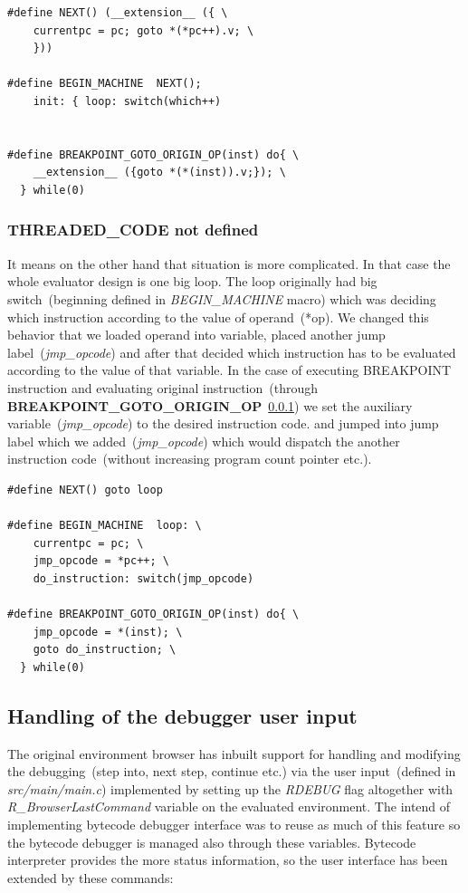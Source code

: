 \documentclass[thesis=M,english]{FITthesis}[2018/10/20]
\begin{document}
\begin{lstlisting}
#define NEXT() (__extension__ ({ \
    currentpc = pc; goto *(*pc++).v; \
    }))

#define BEGIN_MACHINE  NEXT(); 
    init: { loop: switch(which++)


#define BREAKPOINT_GOTO_ORIGIN_OP(inst) do{ \
    __extension__ ({goto *(*(inst)).v;}); \
  } while(0)
\end{lstlisting}


\subsubsection{THREADED{\_}CODE not defined}
It means on the other hand that situation is more complicated. In that case the whole evaluator design is one big loop. The loop originally had big switch~(beginning defined in \textit{BEGIN{\_}MACHINE} macro) which was deciding which instruction according to the value of operand~(*op). We changed this behavior that we loaded operand into variable, placed another jump label~(\textit{jmp{\_}opcode}) and after that decided which instruction has to be evaluated according to the value of that variable. In the case of executing BREAKPOINT instruction and evaluating original instruction~(through \textbf{BREAKPOINT{\_}GOTO{\_}ORIGIN{\_}OP}~\ref{}) we set the auxiliary variable~(\textit{jmp{\_}opcode}) to the desired instruction code.  and jumped into jump label which we added~(\textit{jmp{\_}opcode}) which would dispatch the another instruction code~(without increasing program count pointer etc.).

\begin{lstlisting}
#define NEXT() goto loop

#define BEGIN_MACHINE  loop: \
    currentpc = pc; \
    jmp_opcode = *pc++; \
    do_instruction: switch(jmp_opcode)

#define BREAKPOINT_GOTO_ORIGIN_OP(inst) do{ \
    jmp_opcode = *(inst); \
    goto do_instruction; \
  } while(0)
\end{lstlisting}

\subsection{Handling of the debugger user input}\label{handling-debugger-user-input}

The original environment browser has inbuilt support for handling and modifying the debugging~(step into, next step, continue etc.) via the user input~(defined in \textit{src/main/main.c}) implemented by setting up the \textit{RDEBUG} flag altogether with \textit{R{\_}BrowserLastCommand} variable on the evaluated environment. The intend of implementing bytecode debugger interface was to reuse as much of this feature so the bytecode debugger is managed also through these variables. Bytecode interpreter provides the more status information, so the user interface has been extended by these commands:
\end{document}

